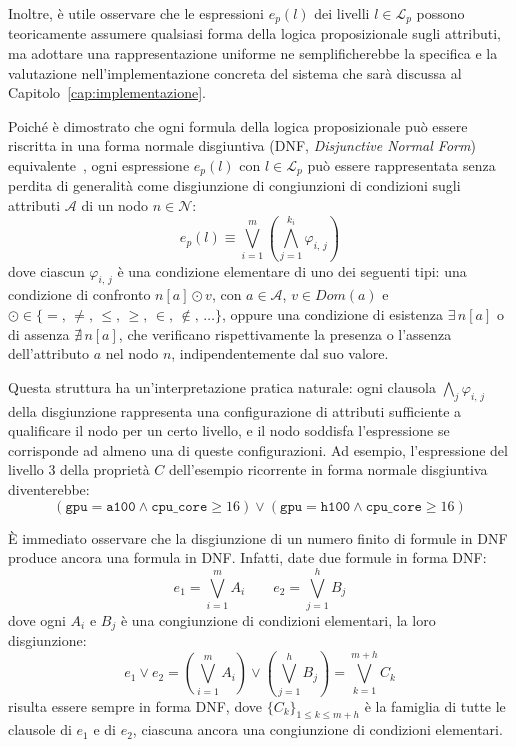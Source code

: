 Inoltre, è utile osservare che le espressioni $e_p(l)$ dei livelli $l \in \mathcal{L}_p$ possono teoricamente assumere qualsiasi forma della logica proposizionale sugli attributi, ma adottare una rappresentazione uniforme ne semplificherebbe la specifica e la valutazione nell'implementazione concreta del sistema che sarà discussa al Capitolo~\ref{cap:implementazione}.

Poiché è dimostrato che ogni formula della logica proposizionale può essere riscritta in una forma normale disgiuntiva (DNF, \emph{Disjunctive Normal Form}) equivalente~\cite{prop-logic-dnf}, ogni espressione $e_p(l)$ con $l \in \mathcal{L}_p$ può essere rappresentata senza perdita di generalità come disgiunzione di congiunzioni di condizioni sugli attributi $\mathcal{A}$ di un nodo $n \in \mathcal{N}$:
\begin{equation}
    e_p(l) \equiv \bigvee_{i=1}^{m} \left( \bigwedge_{j=1}^{k_i} \varphi_{i,\,j} \right)
\end{equation}
dove ciascun $\varphi_{i,\,j}$ è una condizione elementare di uno dei seguenti tipi: una condizione di confronto $n[a] \odot v$, con $a \in \mathcal{A}$, $v \in Dom(a)$ e $\odot \in \{=,\, \neq,\, \leq,\, \geq,\, \in,\, \notin,\, \ldots\}$, oppure una condizione di esistenza $\exists\, n[a]$ o di assenza $\nexists\, n[a]$, che verificano rispettivamente la presenza o l'assenza dell'attributo $a$ nel nodo $n$, indipendentemente dal suo valore.

Questa struttura ha un'interpretazione pratica naturale: ogni clausola $\bigwedge_{j} \varphi_{i,\,j}$ della disgiunzione rappresenta una configurazione di attributi sufficiente a qualificare il nodo per un certo livello, e il nodo soddisfa l'espressione se corrisponde ad almeno una di queste configurazioni. Ad esempio, l'espressione del livello 3 della proprietà $C$ dell'esempio ricorrente in forma normale disgiuntiva diventerebbe: 
\begin{equation}
    (\mathtt{gpu=a100} \land \mathtt{cpu\_core} \geq 16) \lor (\mathtt{gpu=h100} \land \mathtt{cpu\_core} \geq 16)
\end{equation}

È immediato osservare che la disgiunzione di un numero finito di formule in DNF produce ancora una formula in DNF. Infatti, date due formule in forma DNF:
\begin{equation}
    e_1 = \bigvee_{i=1}^{m} A_i \qquad e_2 = \bigvee_{j=1}^{h} B_j
\end{equation}
dove ogni $A_i$ e $B_j$ è una congiunzione di condizioni elementari, la loro disgiunzione:
\begin{equation}
    e_1 \lor e_2 
    = \left( \bigvee_{i=1}^{m} A_i \right) \lor \left( \bigvee_{j=1}^{h} B_j \right)
    = \bigvee_{k=1}^{m+h} C_k
\end{equation}
risulta essere sempre in forma DNF, dove $\{C_k\}_{1 \leq k \leq m + h}$ è la famiglia di tutte le clausole di $e_1$ e di $e_2$, ciascuna ancora una congiunzione di condizioni elementari.

